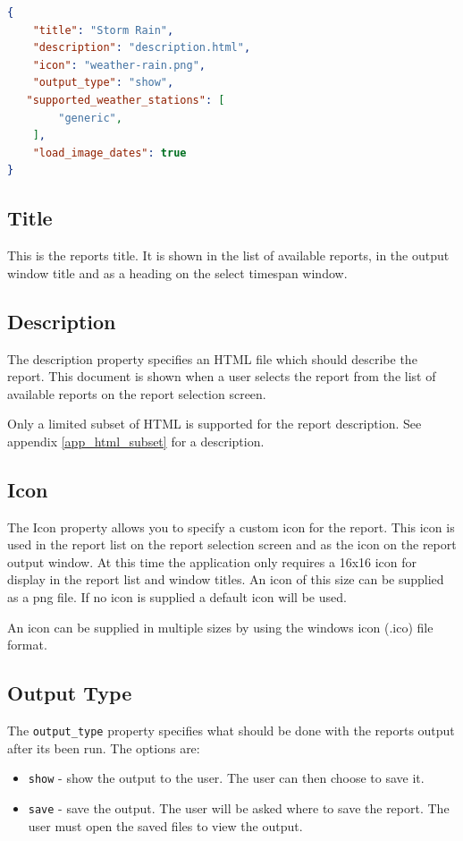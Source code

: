 \documentclass[a4paper,10pt]{book}
\begin{document}
\begin{lstlisting}[language=json]
{
    "title": "Storm Rain",
    "description": "description.html",
    "icon": "weather-rain.png",
    "output_type": "show",
   "supported_weather_stations": [
        "generic",
    ],
    "load_image_dates": true
}
\end{lstlisting}

\subsection{Title}
This is the reports title. It is shown in the list of available reports, in the output window title and as a heading on the select timespan window.

\subsection{Description}
The description property specifies an HTML file which should describe the report. This document is shown when a user selects the report from the list of available reports on the report selection screen.

Only a limited subset of HTML is supported for the report description. See appendix \ref{app_html_subset} for a description.

\subsection{Icon}
The Icon property allows you to specify a custom icon for the report. This icon is used in the report list on the report selection screen and as the icon on the report output window. At this time the application only requires a 16x16 icon for display in the report list and window titles. An icon of this size can be supplied as a png file. If no icon is supplied a default icon will be used.

An icon can be supplied in multiple sizes by using the windows icon (.ico) file format.

\subsection{Output Type}
The \verb|output_type| property specifies what should be done with the reports output after its been run. The options are:
\begin{itemize}
\item \verb|show| - show the output to the user. The user can then choose to save it.
\item \verb|save| - save the output. The user will be asked where to save the report. The user must open the saved files to view the output.
\end{itemize}
\end{document}
